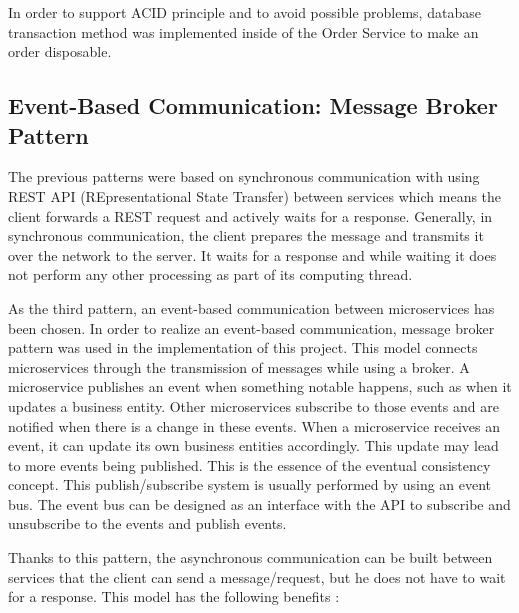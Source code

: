 \documentclass{article}
\begin{document}
\noindent In order to support ACID principle and to avoid possible problems, database transaction method  was implemented inside of the Order Service to make an order disposable.  

\subsection[Event-Based Communication: Message Broker Pattern]{Event-Based Communication: Message Broker \\ Pattern}

The previous patterns were based on synchronous communication with using REST API (REpresentational State Transfer) between services which means the client forwards a REST request and actively waits for a response.  Generally, in synchronous communication, the client prepares the message and transmits it over the network to the server. It waits for a response and while waiting it does not perform any other processing as part of its computing thread\cite{microserviceEventBased2}.  
\linebreak

\noindent As the third pattern, an event-based communication between microservices has been chosen. In order to realize an event-based communication, message broker pattern was used in the implementation of this project. This model connects microservices through the transmission of messages while using a broker. A microservice publishes an event when something notable happens, such as when it updates a business entity. Other microservices subscribe to those events and are notified when there is a change in these events. When a microservice receives an event, it can update its own business entities accordingly. This update may lead to more events being published. This is the essence of the eventual consistency concept. This publish/subscribe system is usually performed by using an event bus. The event bus can be designed as an interface with the API to subscribe and unsubscribe to the events and publish events\cite{microserviceEventBased, microserviceEventBased3, microserviceEventBased4}.
\linebreak

\noindent Thanks to this pattern, the asynchronous communication can be built between services that the client can send a message/request, but he does not have to wait for a response. 
\bigbreak
\noindent This model has the following benefits \cite{microserviceEventBased4, microserviceEventBased2}:
\end{document}
